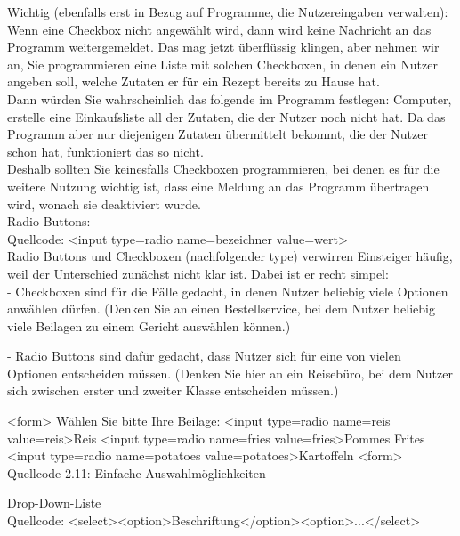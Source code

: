Wichtig (ebenfalls erst in Bezug auf Programme, die Nutzereingaben verwalten): Wenn eine Checkbox nicht angewählt wird, dann wird keine Nachricht an das Programm weitergemeldet. Das mag jetzt überflüssig klingen, aber nehmen wir an, Sie programmieren eine Liste mit solchen Checkboxen, in denen ein Nutzer angeben soll, welche Zutaten er für ein Rezept bereits zu Hause hat. \\

Dann würden Sie wahrscheinlich das folgende im Programm festlegen: Computer, erstelle eine Einkaufsliste all der Zutaten, die der Nutzer noch nicht hat. Da das Programm aber nur diejenigen Zutaten übermittelt bekommt, die der Nutzer schon hat, funktioniert das so nicht.\\

Deshalb sollten Sie keinesfalls Checkboxen programmieren, bei denen es für die weitere Nutzung wichtig ist, dass eine Meldung an das Programm übertragen wird, wonach sie deaktiviert wurde.\\

Radio Buttons:\\

Quellcode: <input type=radio name=bezeichner value=wert>\\

Radio Buttons und Checkboxen (nachfolgender type) verwirren Einsteiger häufig, weil der Unterschied zunächst nicht klar ist. Dabei ist er recht simpel: \\

-	Checkboxen sind für die Fälle gedacht, in denen Nutzer beliebig viele Optionen anwählen dürfen. (Denken Sie an einen Bestellservice, bei dem Nutzer beliebig viele Beilagen zu einem Gericht auswählen können.)

-	Radio Buttons sind dafür gedacht, dass Nutzer sich für eine von vielen Optionen entscheiden müssen. (Denken Sie hier an ein Reisebüro, bei dem Nutzer sich zwischen erster und zweiter Klasse entscheiden müssen.)

<form>
Wählen Sie bitte Ihre Beilage:
<input type=radio name=reis value=reis>Reis
<input type=radio name=fries value=fries>Pommes Frites
<input type=radio name=potatoes value=potatoes>Kartoffeln
<form>
Quellcode 2.11: Einfache Auswahlmöglichkeiten

Drop-Down-Liste\\

Quellcode: <select><option>Beschriftung</option><option>...</select>\\

